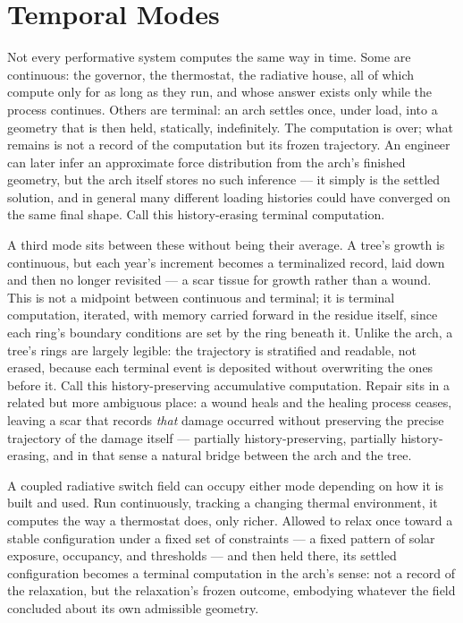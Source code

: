 \documentclass[11pt]{article}
\begin{document}
\section{Temporal Modes}

Not every performative system computes the same way in time. Some are continuous: the governor, the thermostat, the radiative house, all of which compute only for as long as they run, and whose answer exists only while the process continues. Others are terminal: an arch settles once, under load, into a geometry that is then held, statically, indefinitely. The computation is over; what remains is not a record of the computation but its frozen trajectory. An engineer can later infer an approximate force distribution from the arch's finished geometry, but the arch itself stores no such inference --- it simply is the settled solution, and in general many different loading histories could have converged on the same final shape. Call this history-erasing terminal computation.

A third mode sits between these without being their average. A tree's growth is continuous, but each year's increment becomes a terminalized record, laid down and then no longer revisited --- a scar tissue for growth rather than a wound. This is not a midpoint between continuous and terminal; it is terminal computation, iterated, with memory carried forward in the residue itself, since each ring's boundary conditions are set by the ring beneath it. Unlike the arch, a tree's rings are largely legible: the trajectory is stratified and readable, not erased, because each terminal event is deposited without overwriting the ones before it. Call this history-preserving accumulative computation. Repair sits in a related but more ambiguous place: a wound heals and the healing process ceases, leaving a scar that records \emph{that} damage occurred without preserving the precise trajectory of the damage itself --- partially history-preserving, partially history-erasing, and in that sense a natural bridge between the arch and the tree.

A coupled radiative switch field can occupy either mode depending on how it is built and used. Run continuously, tracking a changing thermal environment, it computes the way a thermostat does, only richer. Allowed to relax once toward a stable configuration under a fixed set of constraints --- a fixed pattern of solar exposure, occupancy, and thresholds --- and then held there, its settled configuration becomes a terminal computation in the arch's sense: not a record of the relaxation, but the relaxation's frozen outcome, embodying whatever the field concluded about its own admissible geometry.
\end{document}
